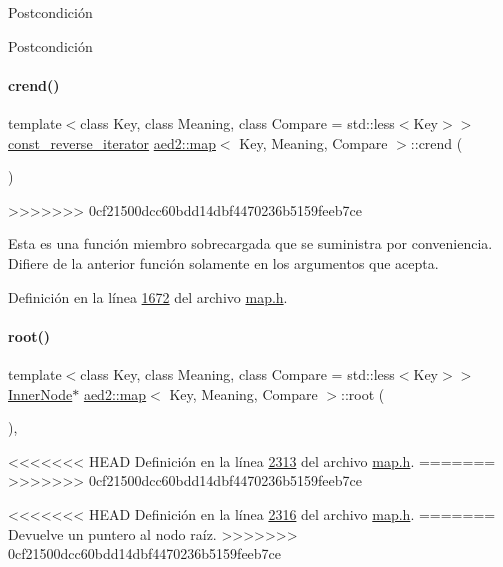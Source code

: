 \begin{DoxyPostcond}{\-Postcondición}
\begin{DoxyPostcond}{\-Postcondición}
\paragraph{\texorpdfstring{crend()}{crend()}}
{\footnotesize\ttfamily template$<$class Key, class Meaning, class Compare = std\+::less$<$\+Key$>$$>$ \\
\hyperlink{classaed2_1_1map_aed66a216549d13078a3ea6978ea0b768_aed66a216549d13078a3ea6978ea0b768}{const\+\_\+reverse\+\_\+iterator} \hyperlink{classaed2_1_1map}{aed2\+::map}$<$ Key, Meaning, Compare $>$\+::crend (\begin{DoxyParamCaption}{ }\end{DoxyParamCaption})\hspace{0.3cm}{\ttfamily [inline]}}
>>>>>>> 0cf21500dcc60bdd14dbf4470236b5159feeb7ce

Esta es una función miembro sobrecargada que se suministra por conveniencia. Difiere de la anterior función solamente en los argumentos que acepta. 

Definición en la línea \hyperlink{map_8h_source_l01672}{1672} del archivo \hyperlink{map_8h_source}{map.\+h}.

\mbox{\label{classaed2_1_1map_a07ab50eda249a57858a34037d4c4c7b2_a07ab50eda249a57858a34037d4c4c7b2}} 
\paragraph{\texorpdfstring{root()}{root()}\hspace{0.1cm}{\footnotesize\ttfamily [1/2]}}
{\footnotesize\ttfamily template$<$class Key, class Meaning, class Compare = std\+::less$<$\+Key$>$$>$ \\
\hyperlink{structaed2_1_1map_1_1InnerNode}{Inner\+Node}$\ast$ \hyperlink{classaed2_1_1map}{aed2\+::map}$<$ Key, Meaning, Compare $>$\+::root (\begin{DoxyParamCaption}{ }\end{DoxyParamCaption})\hspace{0.3cm}{\ttfamily [inline]}, {\ttfamily [private]}}

<<<<<<< HEAD
\-Definición en la línea \hyperlink{map_8h_source_l02313}{2313} del archivo \hyperlink{map_8h_source}{map.\-h}.
=======
>>>>>>> 0cf21500dcc60bdd14dbf4470236b5159feeb7ce


<<<<<<< HEAD
\-Definición en la línea \hyperlink{map_8h_source_l02316}{2316} del archivo \hyperlink{map_8h_source}{map.\-h}.
=======
Devuelve un puntero al nodo raíz. 
>>>>>>> 0cf21500dcc60bdd14dbf4470236b5159feeb7ce


\end{DoxyPostcond}
\end{DoxyPostcond}
